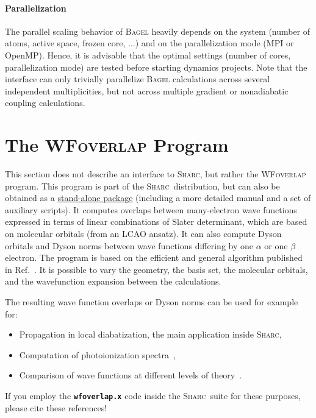 \documentclass[a4paper,10pt,DIV=15,openany]{scrbook}
\newcommand{\tthdump}[1]{#1}
\newcommand{\link}[2]{\href{#1}{#2}}
\newcommand{\sharc}{\textsc{Sharc}}
\newcommand{\ttt}[1]{\textbf{\texttt{#1}}}
\begin{document}
\paragraph{Parallelization}

The parallel scaling behavior of \textsc{Bagel} heavily depends on the system (number of atoms, active space, frozen core, ...) and on the parallelization mode (MPI or OpenMP).
Hence, it is advisable that the optimal settings (number of cores, parallelization mode) are tested before starting dynamics projects.
Note that the interface can only trivially parallelize \textsc{Bagel} calculations across several independent multiplicities, but not across multiple gradient or nonadiabatic coupling calculations.











\tthdump{\FloatBarrier}
\section{The \textsc{WFoverlap} Program}\label{sec:int:wfoverlap}

This section does not describe an interface to \sharc, but rather the \textsc{WFoverlap} program.
This program is part of the \sharc\ distribution, but can also be obtained as a \link{https://sharc-md.org/?page_id=309}{stand-alone package} (including a more detailed manual and a set of auxiliary scripts).
It computes overlaps between many-electron wave functions expressed in terms of linear combinations of Slater determinant, which are based on molecular orbitals (from an LCAO ansatz).
It can also compute Dyson orbitals and Dyson norms between wave functions differing by one $\alpha$ or one $\beta$ electron.
The program is based on the efficient and general algorithm published in Ref.~\cite{Plasser2016JCTC}.
It is possible to vary the geometry, the basis set, the molecular orbitals, and the wavefunction expansion between the calculations.

The resulting wave function overlaps or Dyson norms can be used for example for:
\begin{itemize}
  \item Propagation in local diabatization, the main application inside \sharc,
  \item Computation of photoionization spectra~\cite{Ruckenbauer2016SR,Ruckenbauer2016JCP},
  \item Comparison of wave functions at different levels of theory~\cite{Plasser2016JCP}.
\end{itemize}
If you employ the \ttt{wfoverlap.x} code inside the \sharc\ suite for these purposes, please cite these references!
\end{document}
